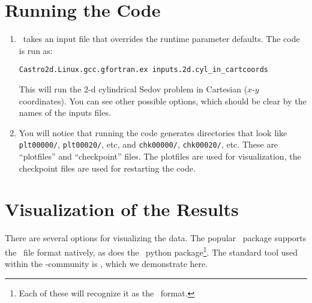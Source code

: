 \section{Running the Code}

\begin{enumerate}

\item \castro\ takes an input file that overrides the runtime parameter defaults.
  The code is run as:
\begin{verbatim}
Castro2d.Linux.gcc.gfortran.ex inputs.2d.cyl_in_cartcoords
\end{verbatim}

This will run the 2-d cylindrical Sedov problem in Cartesian ($x$-$y$
coordinates).  You can see other possible options, which should be
clear by the names of the inputs files.

\item You will notice that running the code generates directories that
  look like {\tt plt00000/}, {\tt plt00020/}, etc, and {\tt chk00000/},
  {\tt chk00020/}, etc. These are ``plotfiles'' and ``checkpoint''
  files. The plotfiles are used for visualization, the checkpoint
  files are used for restarting the code.

\end{enumerate}

\section{Visualization of the Results}

There are several options for visualizing the data.  The popular
\visit\ package supports the \amrex\ file format natively, as does the
\yt\ python package\footnote{Each of these will recognize it as the
  \boxlib\ format.}.  The standard tool used within the
\boxlib-community is \amrvis, which we demonstrate here.


